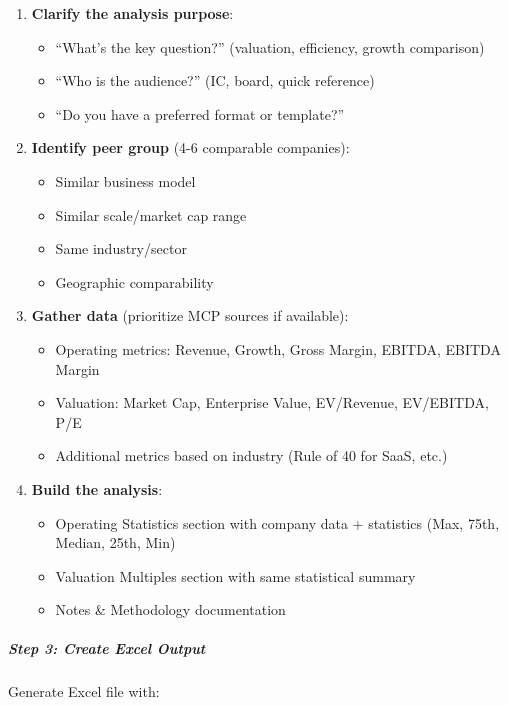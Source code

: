 \documentclass[11pt]{article}
\begin{document}
\begin{enumerate}[leftmargin=*,itemsep=2pt,topsep=2pt]
\item {} \textbf{Clarify the analysis purpose}:
\begin{itemize}[leftmargin=*,itemsep=2pt,topsep=2pt]
\item {} ``What's the key question?'' (valuation, efficiency, growth comparison)
\item {} ``Who is the audience?'' (IC, board, quick reference)
\item {} ``Do you have a preferred format or template?''
\end{itemize}
\item {} \textbf{Identify peer group} (4-6 comparable companies):
\begin{itemize}[leftmargin=*,itemsep=2pt,topsep=2pt]
\item {} Similar business model
\item {} Similar scale/market cap range
\item {} Same industry/sector
\item {} Geographic comparability
\end{itemize}
\item {} \textbf{Gather data} (prioritize MCP sources if available):
\begin{itemize}[leftmargin=*,itemsep=2pt,topsep=2pt]
\item {} Operating metrics: Revenue, Growth, Gross Margin, EBITDA, EBITDA Margin
\item {} Valuation: Market Cap, Enterprise Value, EV/Revenue, EV/EBITDA, P/E
\item {} Additional metrics based on industry (Rule of 40 for SaaS, etc.)
\end{itemize}
\item {} \textbf{Build the analysis}:
\begin{itemize}[leftmargin=*,itemsep=2pt,topsep=2pt]
\item {} Operating Statistics section with company data + statistics (Max, 75th, Median, 25th, Min)
\item {} Valuation Multiples section with same statistical summary
\item {} Notes \& Methodology documentation
\end{itemize}
\end{enumerate}

\subparagraph{Step 3: Create Excel Output}\mbox{}\par

Generate Excel file with:
\end{document}
